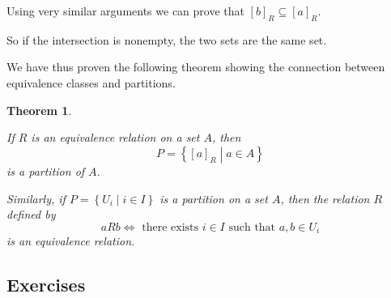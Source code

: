 \documentclass[
]{book}
\newtheorem{theorem}{Theorem}[chapter]
\theoremstyle{definition}
\theoremstyle{definition}
\theoremstyle{definition}
\theoremstyle{definition}
\theoremstyle{remark}
\begin{document}
Using very similar arguments we can prove that \([b]_R \subseteq [a]_R\).

So if the intersection is nonempty, the two sets are the same set.

We have thus proven the following theorem showing the connection between equivalence classes and partitions.

\begin{theorem}
\protect\hypertarget{thm:unlabeled-div-24}{}\label{thm:unlabeled-div-24}

If \(R\) is an equivalence relation on a set \(A\), then \[P = \left\{ [a]_R \middle \vert a \in A\right\}\] is a partition of \(A\).

Similarly, if \(P= \left\{ U_i \middle \vert i \in I\right\}\) is a partition on a set \(A\), then the relation \(R\) defined by
\[aRb \Leftrightarrow \mbox{ there exists } i \in I \mbox{ such that } a,b \in U_i\] is an equivalence relation.

\end{theorem}

\hypertarget{exercises-6}{%
\subsection{Exercises}\label{exercises-6}}
\end{document}
